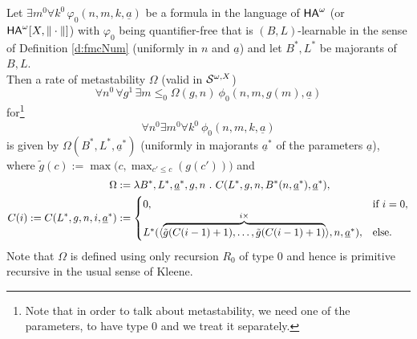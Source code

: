 \begin{prop}\label{p:bg2meta}
Let $\exists m^0\forall k^0\,\varphi_0(n,m,k,\underline{a})$ be a formula 
in the language of ${\textsf{\upshape HA}}^\omega$ (or ${\textsf{\upshape HA}}^\omega[X,\|\cdot\|]$) with $\varphi_0$ being 
quantifier-free that 
is $(B,L)$-learnable in the sense of Definition \ref{d:fmcNum}  
(uniformly in $n$ and  $\underline{a}$) and let $B^*,L^*$ be majorants of  
$B,L$. \\ 
Then a rate of metastability $\Omega$ 
(valid in ${\cal S}^{\omega,X}$) 
\[ \forall n^0\,\forall g^1\, \exists m\le_0\Omega(g,n) \ 
\phi_0(n,m,g(m),\underline{a}) \]
for\footnote{Note that in order to talk about metastability, we need  one of the parameters, to have type 0 and we treat it separately.}  
\[
\forall n^0 \exists m^0 \forall k^0\ \phi_0(n,m,k,\underline{a})\tag{$\phi$}\label{e:phi}
\]
is given by $\Omega(B^*,L^*,\underline{a}^*)$ 
(uniformly in majorants $\underline{a}^*$ of 
the parameters $\underline{a}$), where 
$\tilde g(c):=\max\big(c,\max_{c'\leq c}(g(c'))\big)$ and
\begin{align*} 
  \Omega&:=\lambda B^*,L^*,\underline{a}^*,g,n\ .\ C(L^*,g,n,
B^*(n,\underline{a}^*),\underline{a}^*),\\
C(i):=C(L^*,g,n,i,\underline{a}^*)&:=
\begin{cases}0,&\text{if}\ i=0,\\ L^*(\langle\overbrace{ \tilde g(C(i-1)+1),\ldots,\tilde g(C(i-1)+1) }^{i\times}\rangle,n,\underline{a}^*),&\text{else}.\end{cases}
\end{align*}
Note that $\Omega$ is defined using only recursion $R_0$ of type $0$ and 
hence is primitive recursive in the usual sense of Kleene.
\end{prop}

